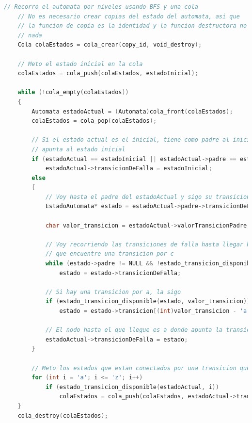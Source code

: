 \documentclass{article}
\begin{document}
\begin{lstlisting}[language=C]
    // Recorro el automata por niveles usando BFS y una cola
    // No es necesario crear copias del estado del automata, asi que
    // la funcion de copia es la identidad y la funcion destructora no hace
    // nada
    Cola colaEstados = cola_crear(copy_id, void_destroy);

    // Meto el estado inicial en la cola
    colaEstados = cola_push(colaEstados, estadoInicial);

    while (!cola_empty(colaEstados))
    {
        Automata estadoActual = (Automata)cola_front(colaEstados);
        colaEstados = cola_pop(colaEstados);

        // Si el estado actual es el inicial, tiene como padre al inicial o es un estado de aceptacion, su transicion de falla
        // apunta al estado inicial
        if (estadoActual == estadoInicial || estadoActual->padre == estadoInicial || estadoActual->palabraAceptada)
            estadoActual->transicionDeFalla = estadoInicial;
        else
        {
            // Voy hasta el padre del estadoActual y sigo su transicion de falla
            EstadoAutomata* estado = estadoActual->padre->transicionDeFalla;

            char valor_transicion = estadoActual->valorTransicionPadre;
            
            // Voy recorriendo las transiciones de falla hasta llegar hasta la raiz o hasta
            // que encuentre una transicion por c
            while (estado->padre != NULL && !estado_transicion_disponible(estado, valor_transicion))
                estado = estado->transicionDeFalla;
            
            // Si hay una transicion por a, la sigo
            if (estado_transicion_disponible(estado, valor_transicion))
                estado = estado->transicion[(int)valor_transicion - 'a'];
            
            // El nodo hasta el que llegue es a donde apunta la transicion de falla de N
            estadoActual->transicionDeFalla = estado;
        }   

        // Meto los estados que estan conectados por una transicion que no es de falla en la cola
        for (int i = 'a'; i <= 'z'; i++)
            if (estado_transicion_disponible(estadoActual, i))
                colaEstados = cola_push(colaEstados, estadoActual->transicion[i - 'a']);
    }
    cola_destroy(colaEstados);
\end{lstlisting}
\end{document}
